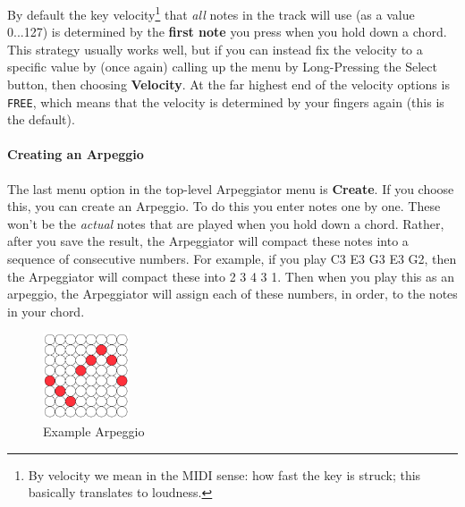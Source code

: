\documentclass{article}
\begin{document}
By default the key velocity\footnote{By velocity we mean in the MIDI sense: how fast the key is struck; this basically translates to loudness.} that {\it all} notes in the track will use (as a value 0...127) is determined by the {\bf first note} you press when you hold down a chord.  This strategy usually works well, but if you can instead fix the velocity to a specific value by (once again) calling up the menu by Long-Pressing the Select button, then choosing {\bf Velocity}.  At the far highest end of the velocity options is \texttt{FREE}, which means that the velocity is determined by your fingers again (this is the default).

\paragraph{Creating an Arpeggio}

The last menu option in the top-level Arpeggiator menu is {\bf Create}.  If you choose this, you can create an Arpeggio.  To do this you enter notes one by one.  These won't be the {\it actual} notes that are played when you hold down a chord.  Rather, after you save the result, the Arpeggiator will compact these notes into a sequence of consecutive numbers.  For example, if you play C3 E3 G3 E3 G2, then the Arpeggiator will compact these into 2 3 4 3 1.  Then when you play this as an arpeggio, the Arpeggiator will assign each of these numbers, in order, to the notes in your chord. 

\begin{figure}
\begin{center}
\vspace{-2em}
\includegraphics[width=1in]{arpeggioexample.pdf}\\
Example Arpeggio\\[2em]
\end{center}
\vspace{-2em}
\label{arpeggioediting}
\end{figure}
\end{document}
